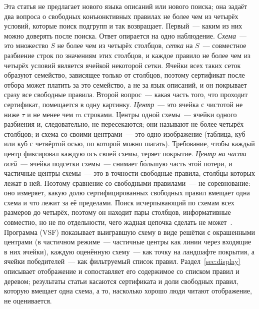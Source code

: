 \documentclass[11pt]{article}
\begin{document}
Эта статья не предлагает нового языка описаний или нового поиска; она задаёт два вопроса о свободных конъюнктивных правилах не более чем из четырёх условий, которые поиск подгрупп и так возвращает. Первый~--- каким из них можно доверять после поиска. Ответ опирается на одно наблюдение. \emph{Схема}~--- это множество $S$ не более чем из четырёх столбцов, \emph{сетка} на $S$~--- совместное разбиение строк по значениям этих столбцов, и каждое правило не более чем из четырёх условий является ячейкой некоторой сетки. Ячейки всех таких сеток образуют семейство, зависящее только от столбцов, поэтому сертификат после отбора может платить за это семейство, а не за язык описаний, и он покрывает сразу все свободные правила. Второй вопрос~--- какая часть того, что проходит сертификат, помещается в одну картинку. \emph{Центр}~--- это ячейка с чистотой не ниже $\tau$ и не менее чем $m$ строками. Центры одной схемы~--- ячейки одного разбиения и, следовательно, не пересекаются; они называют не более четырёх столбцов; и схема со своими центрами~--- это одно изображение (таблица, куб или куб с четвёртой осью, по которой можно шагать). Требование, чтобы каждый центр фиксировал каждую ось своей схемы, теряет покрытие. \emph{Центр на части осей}~--- ячейка подсетки схемы~--- снимает бо́льшую часть этой потери, и частичные центры схемы~--- это в точности свободные правила, столбцы которых лежат в ней. Поэтому сравнение со свободными правилами~--- не соревнование: оно измеряет, какую долю сертифицированных свободных правил вмещает одна схема и что лежит за её пределами. Поиск исчерпывающий по схемам всех размеров до четырёх, поэтому он находит пары столбцов, информативные совместно, но не по отдельности, чего жадная цепочка сделать не может~\citep{krause2005}. Программа (VSF) показывает выигравшую схему в виде решётки с окрашенными центрами (в частичном режиме~--- частичные центры как линии через входящие в них ячейки), каждую оценённую схему~--- как точку на ландшафте покрытия, а ячейки победителей~--- как фильтруемый список правил. Раздел~\ref{sec:display} описывает отображение и сопоставляет его содержимое со списком правил и деревом; результаты статьи касаются сертификата и доли свободных правил, которую вмещает одна схема, а то, насколько хорошо люди читают отображение, не оценивается.
\end{document}
